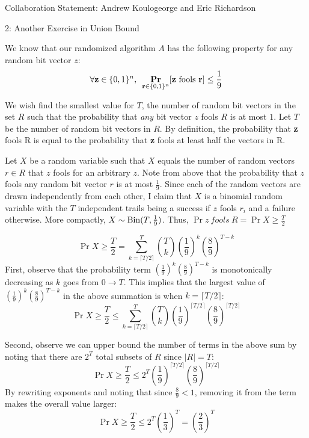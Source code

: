 \documentclass[12pt]{article}
\begin{document}

Collaboration Statement: Andrew Koulogeorge and Eric Richardson 

\begin{problem}{2: Another Exercise in Union Bound} \ \\

\end{problem}

\begin{solution}
We know that our randomized algorithm $A$ has the following property for any random bit vector $z$:
\[
\forall \textbf{z} \in \{0,1\}^n, \hspace{5pt} \underset{\textbf{r} \in \{0,1\}^n}{\textbf{Pr}}[\text{\textbf{z} fools \textbf{r}}] \leq \frac{1}{9}
\]

We wish find the smallest value for $T$, the number of random bit vectors in the set $R$ such that the probability that \textit{any} bit vector $z$  fools $R$ is at most $1$. Let $T$ be the number of random bit vectors in $R$. By definition, the probability that \textbf{z} fools R is equal to the probability that \textbf{z} fools at least half the vectors in R. 

Let $X$ be a random variable such that $X$ equals the number of random vectors $r \in R$ that $z$ fools for an arbitrary $z$. Note from above that the probability that $z$ fools any random bit vector $r$ is at most $\frac{1}{9}$. Since each of the random vectors are drawn independently from each other, I claim that $X$ is a binomial random variable with the $T$ independent trails being a success if $z$ fools $r_i$ and a failure otherwise. More compactly, $X\sim\operatorname{Bin}(T,\frac{1}{9})$. Thus, $\Pr{z ~ fools~ R} = \Pr{X \geq \frac{T}{2}}$

\[
\Pr{X \geq \frac{T}{2}} = \sum_{k = \lceil T/2 \rceil}^{T}{\binom{T}{k} \left(\frac{1}{9}\right)^{k} \left(\frac{8}{9}\right)^{T-k}}
\]
First,  observe that the probability term  $\left(\frac{1}{9}\right)^{k} \left(\frac{8}{9}\right)^{T-k}$ is monotonically decreasing as $k$ goes from $0 \rightarrow T$. This implies that the largest value of $\left(\frac{1}{9}\right)^{k} \left(\frac{8}{9}\right)^{T-k}$ in the above summation is when $k=\lceil T/2 \rceil$:
\[
\Pr{X \geq \frac{T}{2}} \leq \sum_{k = \lceil T/2 \rceil}^{T}{\binom{T}{k} \left(\frac{1}{9}\right)^{\lceil T/2 \rceil} \left(\frac{8}{9}\right)^{\lceil T/2 \rceil}}
\]


Second, observe we can upper bound the number of terms in the above sum by noting that there are $2^T$ total subsets of $R$ since $|R| = T$:
\[
\Pr{X \geq \frac{T}{2}} \leq 2^T \left(\frac{1}{9}\right)^{\lceil T/2 \rceil} \left(\frac{8}{9}\right)^{\lceil T/2 \rceil}
\]
By rewriting exponents and noting that since  $\frac{8}{9} < 1$, removing it from the term makes the overall value larger:
\[
\Pr{X \geq \frac{T}{2}} \leq 2^T \left(\frac{1}{3}\right)^{T} = \left(\frac{2}{3}\right)^T 
\]


\end{solution}
\end{document}
